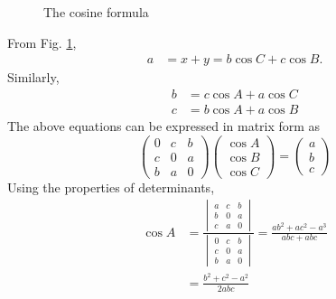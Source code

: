 \begin{enumerate}[label=\arabic*.,ref=\thesubsection.\theenumi]
\begin{figure}[!ht]
	\begin{center}
		
		\resizebox{\columnwidth}{!}{}
	\end{center}
	\caption{The cosine formula}
	\label{fig:tri_cosine_formula}	
\end{figure}

\solution From Fig. \ref{fig:tri_cosine_formula}, 
%
\begin{align}
a &= x + y = b \cos C + c \cos B.
\end{align}
%
Similarly,
%
\begin{align}
b &= c \cos A + a \cos C \\
c &= b \cos A + a \cos B
\end{align}
%
The above equations can be expressed in matrix form as
%
\begin{equation}
\begin{pmatrix}
0 & c & b \\
c & 0 & a \\
b & a & 0
\end{pmatrix}
\begin{pmatrix}
\cos A \\
\cos B \\
\cos C
\end{pmatrix}
= 
\begin{pmatrix}
a\\
b\\
c
\end{pmatrix}
\end{equation}
%
Using the properties of determinants,
%
\begin{align}
\cos A &= \frac{
\begin{vmatrix}
a & c & b \\
b & 0 & a \\
c & a & 0
\end{vmatrix}
	}
	{
\begin{vmatrix}
0 & c & b \\
c & 0 & a \\
b & a & 0
\end{vmatrix}
	}
	=\frac{ab^2 + ac^2 - a^3}{abc + abc} 
\\
&= \frac{b^2 + c^2 - a^2}{2abc}
\end{align}
%
\end{enumerate}

